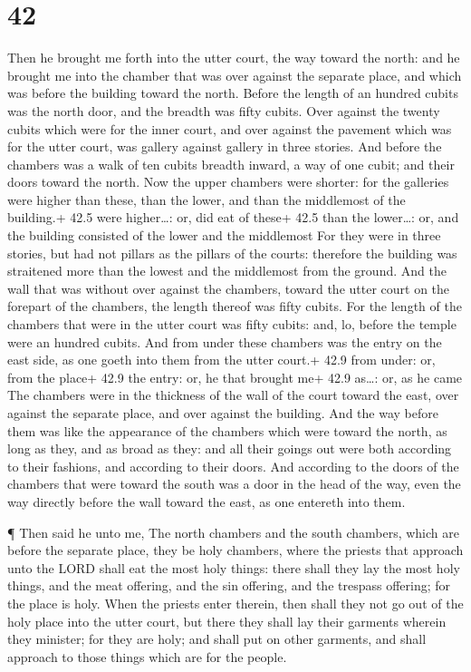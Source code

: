 \hypertarget{section-41}{%
\section{42}\label{section-41}}

 Then he brought me forth into the utter court, the way
toward the north: and he brought me into the chamber that was over
against the separate place, and which was before the building toward the
north.  Before the length of an hundred cubits was the north
door, and the breadth was fifty cubits.  Over against the
twenty cubits which were for the inner court, and over against the
pavement which was for the utter court, was gallery against gallery in
three stories.  And before the chambers was a walk of ten
cubits breadth inward, a way of one cubit; and their doors toward the
north.  Now the upper chambers were shorter: for the
galleries were higher than these, than the lower, and than the
middlemost of the building.+ 42.5 were higher\ldots: or, did eat of
these+ 42.5 than the lower\ldots: or, and the building consisted of the
lower and the middlemost  For they were in three stories,
but had not pillars as the pillars of the courts: therefore the building
was straitened more than the lowest and the middlemost from the ground.
 And the wall that was without over against the chambers,
toward the utter court on the forepart of the chambers, the length
thereof was fifty cubits.  For the length of the chambers
that were in the utter court was fifty cubits: and, lo, before the
temple were an hundred cubits.  And from under these
chambers was the entry on the east side, as one goeth into them from the
utter court.+ 42.9 from under: or, from the place+ 42.9 the entry: or,
he that brought me+ 42.9 as\ldots: or, as he came  The
chambers were in the thickness of the wall of the court toward the east,
over against the separate place, and over against the building.
 And the way before them was like the appearance of the
chambers which were toward the north, as long as they, and as broad as
they: and all their goings out were both according to their fashions,
and according to their doors.  And according to the doors
of the chambers that were toward the south was a door in the head of the
way, even the way directly before the wall toward the east, as one
entereth into them.

 ¶ Then said he unto me, The north chambers and the south
chambers, which are before the separate place, they be holy chambers,
where the priests that approach unto the LORD shall eat the most holy
things: there shall they lay the most holy things, and the meat
offering, and the sin offering, and the trespass offering; for the place
is holy.  When the priests enter therein, then shall they
not go out of the holy place into the utter court, but there they shall
lay their garments wherein they minister; for they are holy; and shall
put on other garments, and shall approach to those things which are for
the people.

